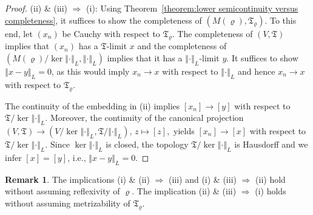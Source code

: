 \documentclass[a4paper,11pt,reqno]{amsart}
\newtheorem{theorem}[lemma]{Theorem}
\theoremstyle{definition}
\newtheorem{remark}[lemma]{Remark}
\numberwithin{equation}{section}
\newcommand{\vr}{{\varrho}}
\newcommand{\av}[1]{\left\Vert #1\right\Vert}
\newcommand{\1}{\mathds{1}}
\begin{document}
\begin{proof}
 (ii) \& (iii) $\Rightarrow$ (i): Using Theorem~\ref{theorem:lower semicontinuity versus completeness}, it suffices to show the completeness of $(M(\vr),\mathfrak{T}_\vr)$. To this end, let $(x_n)$ be Cauchy with respect to $\mathfrak{T}_\vr$.  The completeness of $(V,\mathfrak{T})$ implies that $(x_n)$ has a $\mathfrak{T}$-limit $x$ and the completeness of $(M(\vr)/\ker \av{\cdot}_L ,\av{\cdot}_L)$ implies that it has a $\av{\cdot}_L$-limit $y$. It suffices to show $ \av{x - y}_L = 0$, as this would imply $x_n \to x$ with respect to $\av{\cdot}_L$ and hence $x_n \to x$ with respect to $\mathfrak{T}_\vr$.
 
  The continuity of the embedding in (ii) implies $[x_n]  \to [y]$ with respect to $\mathfrak{T} / \ker\av{\cdot}_L$. Moreover, the continuity of the canonical projection $(V,\mathfrak{T}) \to (V /\ker \av{\cdot}_L, \mathfrak{T}/ \av{\cdot}_L), \, z \mapsto [z],$ yields $[x_n] \to [x]$  with respect to $\mathfrak{T} / \ker\av{\cdot}_L$. Since $\ker\av{\cdot}_L$ is closed, the topology $\mathfrak{T} / \ker\av{\cdot}_L$ is Hausdorff and we infer $[x] = [y]$, i.e., $ \av{x - y}_L = 0$. 
\end{proof}

\begin{remark}
 The implications (i) \& (ii) $\Rightarrow$ (iii)  and  (i) \& (iii) $\Rightarrow$ (ii) hold without assuming  reflexivity of $\vr$. The implication (ii) \& (iii) $\Rightarrow$ (i) holds without assuming metrizability of $\mathfrak{T}_\vr$.  
\end{remark}


% 
% 
%  
% 
%  
 
\end{document}
